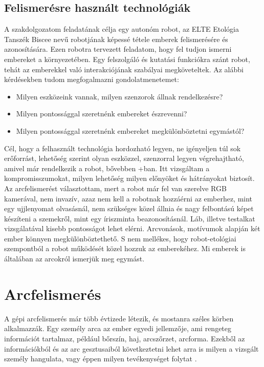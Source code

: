 \subsection{Felismerésre használt technológiák}
A szakdolgozatom feladatának célja egy autonóm robot, az ELTE Etológia Tanszék Biscee nevű robotjának képessé tétele emberek felismerésére és azonosítására. Ezen robotra tervezett feladatom, hogy fel tudjon ismerni embereket a környezetében. Egy felszolgáló és kutatási funkciókra szánt robot, tehát az emberekkel való interakciójának szabályai megköveteltek. Az alábbi kérdésekben tudom megfogalmazni gondolatmenetemet:
\begin{itemize}
\item Milyen eszközeink vannak, milyen szenzorok állnak rendelkezésre?
\item Milyen pontossággal szeretnénk embereket észrevenni?
\item Milyen pontossággal szeretnénk embereket megkülönböztetni egymástól?
\end{itemize}

Cél, hogy a felhasznált technológia hordozható legyen, ne igényeljen túl sok erőforrást, lehetőség szerint olyan eszközzel, szenzorral legyen végrehajtható, amivel már rendelkezik a robot, bővebben \az+ban. Itt vizsgáltam a kompromisszumokat, milyen lehetőség milyen előnyöket és hátrányokat biztosít.
Az arcfelismerést választottam, mert a robot már fel van szerelve RGB kamerával, nem invazív, azaz nem kell a robotnak hozzáérni az emberhez, mint egy ujjlenyomat olvasásnál, nem szükséges közel állnia és nagy felbontású képet készíteni a szemekről, mint egy íriszminta beazonosításnál. Láb, illetve testalkat vizsgálatával kisebb pontosságot lehet elérni. Arcvonások, motívumok alapján két ember könnyen megkülönböztethető. S nem mellékes, hogy robot-etológiai szempontból a robot működését közel hozzuk az emberekéhez. Mi emberek is általában az arcokról ismerjük meg egymást.


\section{Arcfelismerés}
A gépi arcfelismerés már több évtizede létezik, és mostanra széles körben alkalmazzák.
Egy személy arca az ember egyedi jellemzője, ami rengeteg információt tartalmaz, például bőrszín, haj, arcszőrzet, arcforma. Ezekből az információkból és az arc gesztusaiból következtetni lehet arra is milyen a vizsgált személy hangulata, vagy éppen milyen tevékenységet folytat \cite{artc08}.

